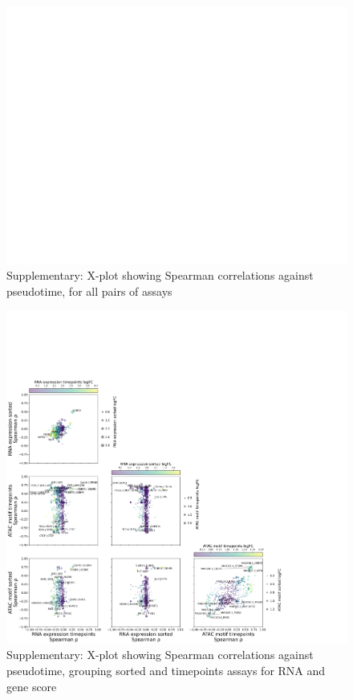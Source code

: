 \documentclass[a4paper]{article}
\begin{document}
\begin{figure}[!htb]
  \centering
  \includegraphics[width=\textwidth]{../figures/hematopoiesis/Neutrophil_40_106_smooth_none_detailed_X_plot.png}
  \caption{Supplementary: X-plot showing Spearman correlations against pseudotime, for all pairs of assays}
\end{figure}

\begin{figure}[!htb]
  \centering
  \includegraphics[width=\textwidth]{../figures/hematopoiesis/Neutrophil_40_106_smooth_none_semi_detailed_X_plot.png}
  \caption{Supplementary: X-plot showing Spearman correlations against pseudotime, grouping sorted and timepoints assays for RNA and gene score}
\end{figure}
\end{document}
